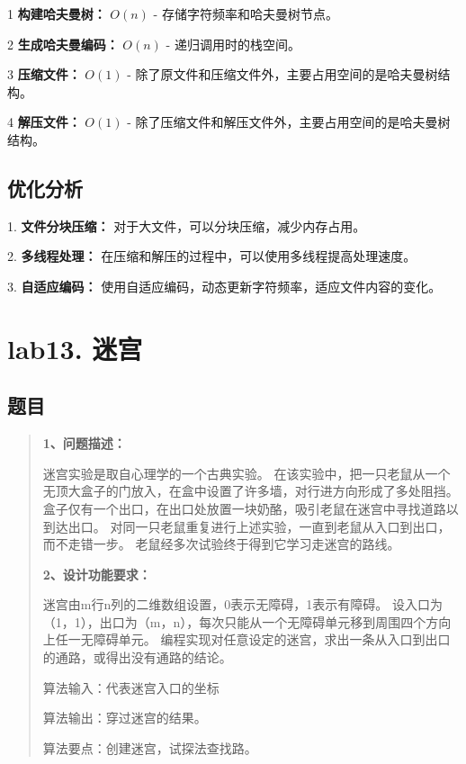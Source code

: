 \documentclass[UTF8]{ctexart}
\begin{document}
1 \textbf{构建哈夫曼树：} $O(n)$ - 存储字符频率和哈夫曼树节点。

2 \textbf{生成哈夫曼编码：} $O(n)$ - 递归调用时的栈空间。

3 \textbf{压缩文件：} $O(1)$ - 除了原文件和压缩文件外，主要占用空间的是哈夫曼树结构。

4 \textbf{解压文件：} $O(1)$ - 除了压缩文件和解压文件外，主要占用空间的是哈夫曼树结构。


\subsection*{优化分析}

1. \textbf{文件分块压缩：} 对于大文件，可以分块压缩，减少内存占用。

2. \textbf{多线程处理：} 在压缩和解压的过程中，可以使用多线程提高处理速度。

3. \textbf{自适应编码：} 使用自适应编码，动态更新字符频率，适应文件内容的变化。

\newpage
\section*{lab13. 迷宫}
\subsection*{题目}
\begin{abstract}
    \textbf{1、问题描述：}

        迷宫实验是取自心理学的一个古典实验。
        在该实验中，把一只老鼠从一个无顶大盒子的门放入，在盒中设置了许多墙，对行进方向形成了多处阻挡。
        盒子仅有一个出口，在出口处放置一块奶酪，吸引老鼠在迷宫中寻找道路以到达出口。
        对同一只老鼠重复进行上述实验，一直到老鼠从入口到出口，而不走错一步。
        老鼠经多次试验终于得到它学习走迷宫的路线。

    \textbf{2、设计功能要求：}

        迷宫由m行n列的二维数组设置，0表示无障碍，1表示有障碍。
        设入口为（1，1），出口为（m，n），每次只能从一个无障碍单元移到周围四个方向上任一无障碍单元。
        编程实现对任意设定的迷宫，求出一条从入口到出口的通路，或得出没有通路的结论。 

        算法输入：代表迷宫入口的坐标

        算法输出：穿过迷宫的结果。 

        算法要点：创建迷宫，试探法查找路。


\end{abstract}
\end{document}
